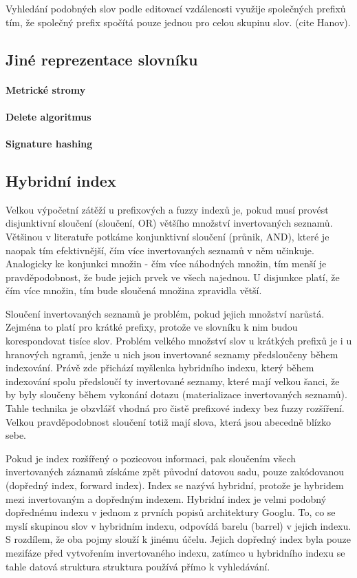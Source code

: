 \documentclass[11pt,letterpaper,oneside,openright]{book}
\begin{document}
Vyhledání podobných slov podle editovací vzdálenosti využije společných prefixů
tím, že společný prefix spočítá pouze jednou pro celou skupinu slov. (cite
Hanov).

\subsection{Jiné reprezentace slovníku}
\paragraph{Metrické stromy}
\paragraph{Delete algoritmus}
\paragraph{Signature hashing}

\subsection{Hybridní index}
Velkou výpočetní zátěží u prefixových a fuzzy indexů je, pokud musí provést
disjunktivní sloučení (sloučení, OR) většího množství invertovaných seznamů.
Většinou v literatuře potkáme konjunktivní sloučení (průnik, AND), které je
naopak tím efektivnější, čím více invertovaných seznamů v něm učinkuje.
Analogicky ke konjunkci množin - čím více náhodných množin, tím menší je
pravděpodobnost, že bude jejich prvek ve všech najednou. U disjunkce platí, že
čím více množin, tím bude sloučená množina zpravidla větší.

Sloučení invertovaných seznamů je problém, pokud jejich množství narůstá.
Zejména to platí pro krátké prefixy, protože ve slovníku k nim budou
korespondovat tisíce slov. Problém velkého množství slov u krátkých prefixů je
i u hranových ngramů, jenže u nich jsou invertované seznamy předsloučeny během
indexování. Právě zde přichází myšlenka hybridního indexu, který během
indexování spolu předsloučí ty invertované seznamy, které mají velkou šanci, že
by byly sloučeny během vykonání dotazu (materializace invertovaných seznamů).
Tahle technika je obzvlášť vhodná pro čistě prefixové indexy bez fuzzy
rozšíření. Velkou pravděpodobnost sloučení totiž mají slova, která jsou
abecedně blízko sebe.

Pokud je index rozšířený o pozicovou informaci, pak sloučením všech
invertovaných záznamů získáme zpět původní datovou sadu, pouze zakódovanou
(dopředný index, forward index). Index se nazývá hybridní, protože je hybridem
mezi invertovaným a dopředným indexem.  Hybridní index je velmi podobný
dopřednému indexu v jednom z prvních popisů architektury Googlu. To, co se
myslí skupinou slov v hybridním indexu, odpovídá barelu (barrel) v jejich
indexu. S rozdílem, že oba pojmy slouží k jinému účelu. Jejich dopředný index
byla pouze mezifáze před vytvořením invertovaného indexu, zatímco u hybridního
indexu se tahle datová struktura struktura používá přímo k vyhledávání.
\end{document}
